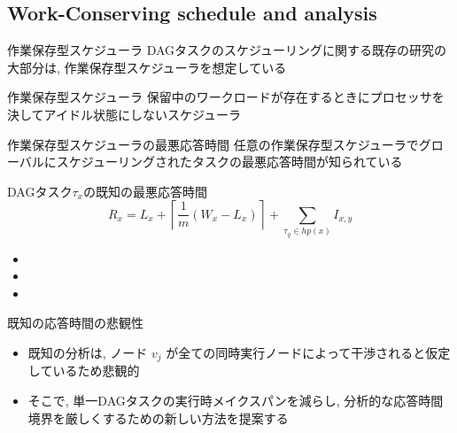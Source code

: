 \subsection{Work-Conserving schedule and analysis}
\label{ssec: wc}

\begin{frame}{作業保存型スケジューラ}
    DAGタスクのスケジューリングに関する既存の研究の大部分は, 作業保存型スケジューラを想定している
    \begin{block}{作業保存型スケジューラ}
        保留中のワークロードが存在するときにプロセッサを決してアイドル状態にしないスケジューラ
    \end{block}
\end{frame}

\begin{frame}{作業保存型スケジューラの最悪応答時間}
    任意の作業保存型スケジューラでグローバルにスケジューリングされたタスクの最悪応答時間が知られている
    \begin{block}{DAGタスク$\tau_x$の既知の最悪応答時間}
        \begin{equation*}
            R_{x}=L_{x}+\left\lceil\frac{1}{m}\left(W_{x}-L_{x}\right)\right\rceil+\sum_{\tau_{y} \in h p(x)} I_{x, y}
        \end{equation*}
        \begin{itemize}
            \item {}
            \item {}
            \item {}
        \end{itemize}
    \end{block}
\end{frame}

\begin{frame}{既知の応答時間の悲観性}
    \begin{itemize}
        \item 既知の分析は, ノード $v_{j}$ が全ての同時実行ノードによって干渉されると仮定しているため悲観的
        \item そこで, 単一DAGタスクの実行時メイクスパンを減らし, 分析的な応答時間境界を厳しくするための新しい方法を提案する
    \end{itemize}
\end{frame}

